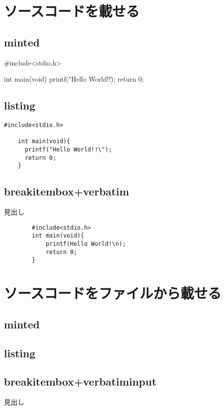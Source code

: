 \documentclass[a4j,titlepage,dvipdfmx]{jsarticle}   %
\begin{document}
  \section{ソースコードを載せる}
  \subsection{minted}
  \begin{myMinted}
    #include<stdio.h>

    int main(void){
      printf("Hello World!!\");
      return 0;
    }
  \end{myMinted}

  \subsection{listing}
  \begin{lstlisting}[caption=listingのテスト,label=listTest]
    #include<stdio.h>

    int main(void){
      printf("Hello World!!\");
      return 0;
    }
  \end{lstlisting}

  \subsection{breakitembox+verbatim}
  \begin{breakitembox}[l]{見出し}
    \begin{verbatim}
        #include<stdio.h>
        int main(void){
            printf(Hello World!\n);
            return 0;
        }
    \end{verbatim}
\end{breakitembox}

\section{ソースコードをファイルから載せる}
\subsection{minted}

\subsection{listing}


\subsection{breakitembox+verbatiminput}
\begin{breakitembox}[l]{見出し}
   
\end{breakitembox}
\end{document}
